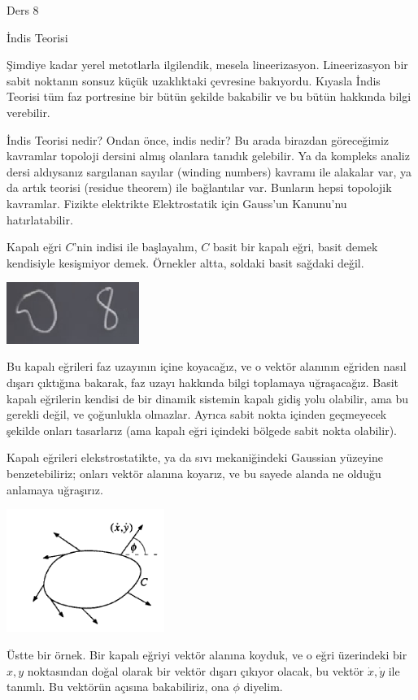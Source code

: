 \documentclass[12pt,fleqn]{article}\usepackage{../../common}
\begin{document}
Ders 8

İndis Teorisi

Şimdiye kadar yerel metotlarla ilgilendik, mesela lineerizasyon. Lineerizasyon
bir sabit noktanın sonsuz küçük uzaklıktaki çevresine bakıyordu. Kıyasla İndis
Teorisi tüm faz portresine bir bütün şekilde bakabilir ve bu bütün hakkında
bilgi verebilir. 

İndis Teorisi nedir? Ondan önce, indis nedir? Bu arada birazdan göreceğimiz
kavramlar topoloji dersini almış olanlara tanıdık gelebilir. Ya da kompleks
analiz dersi aldıysanız sargılanan sayılar (winding numbers) kavramı ile
alakalar var, ya da artık teorisi (residue theorem) ile bağlantılar
var. Bunların hepsi topolojik kavramlar. Fizikte elektrikte Elektrostatik için
Gauss'un Kanunu'nu hatırlatabilir. 

Kapalı eğri $C$'nin indisi ile başlayalım, $C$ basit bir kapalı eğri, basit
demek kendisiyle kesişmiyor demek. Örnekler altta, soldaki basit sağdaki
değil.

\includegraphics[height=2cm]{08_11.png}

Bu kapalı eğrileri faz uzayının içine koyacağız, ve o vektör alanının eğriden
nasıl dışarı çıktığına bakarak, faz uzayı hakkında bilgi toplamaya
uğraşacağız. Basit kapalı eğrilerin kendisi de bir dinamik sistemin kapalı gidiş
yolu olabilir, ama bu gerekli değil, ve çoğunlukla olmazlar. Ayrıca sabit nokta
içinden geçmeyecek şekilde onları tasarlarız (ama kapalı eğri içindeki bölgede
sabit nokta olabilir).

Kapalı eğrileri elekstrostatikte, ya da sıvı mekaniğindeki Gaussian yüzeyine
benzetebiliriz; onları vektör alanına koyarız, ve bu sayede alanda ne olduğu
anlamaya uğraşırız.

\includegraphics[height=4cm]{08_12.png}

Üstte bir örnek. Bir kapalı eğriyi vektör alanına koyduk, ve o eğri üzerindeki
bir $x,y$ noktasından doğal olarak bir vektör dışarı çıkıyor olacak, bu vektör
$\dot{x},\dot{y}$ ile tanımlı. Bu vektörün açısına bakabiliriz, ona $\phi$
diyelim.
\end{document}

